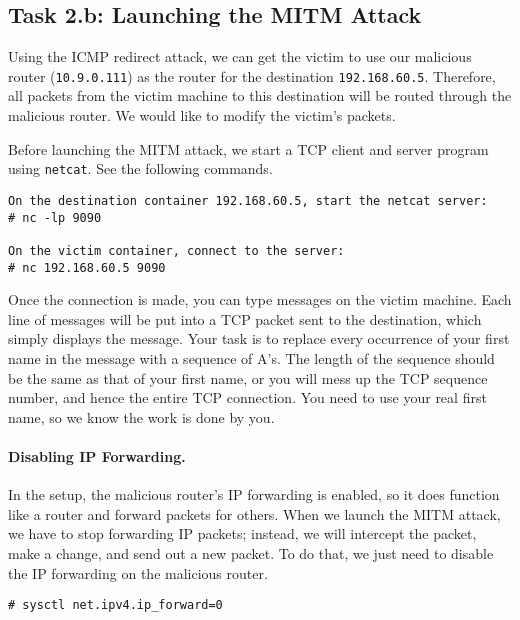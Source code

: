 \subsection{Task 2.b: Launching the MITM Attack} 

Using the ICMP redirect attack, we can get the victim to use 
our malicious router (\texttt{10.9.0.111}) as the router for the destination
\texttt{192.168.60.5}. Therefore, all packets from the victim machine 
to this destination will be routed through the malicious router.
We would like to modify the victim's packets. 


Before launching the MITM attack, we start a TCP client and server program
using \texttt{netcat}. See the following commands.  

\begin{lstlisting}
On the destination container 192.168.60.5, start the netcat server:
# nc -lp 9090

On the victim container, connect to the server:
# nc 192.168.60.5 9090
\end{lstlisting}


Once the connection is made, you can type messages on the victim machine.
Each line of messages will be put into a TCP packet sent
to the destination, which simply displays the message.
Your task is to replace every occurrence of your first name in the
message with a sequence of A's. The length of the sequence should be the
same as that of your first name, or you will mess up the TCP sequence
number, and hence the entire TCP connection. You need to use your real
first name, so we know the work is done by you.



\paragraph{Disabling IP Forwarding.}
In the setup, the malicious router's IP forwarding is enabled, so it does 
function like a router and forward packets for others. When we launch 
the MITM attack, we have to stop forwarding IP packets; instead,
we will intercept the packet, make a change, and send out a new packet. 
To do that, we just need to disable the IP forwarding on the malicious 
router. 

\begin{lstlisting}
# sysctl net.ipv4.ip_forward=0
\end{lstlisting}


